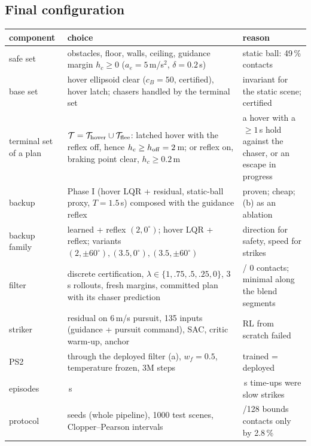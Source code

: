 \documentclass[11pt]{article}
\begin{document}
\subsection{Final configuration}
\begin{center}\small
\begin{tabularx}{\textwidth}{>{\raggedright\arraybackslash}p{2.6cm}>{\raggedright\arraybackslash}X>{\raggedright\arraybackslash}p{4.6cm}}\toprule
component & choice & reason\\\midrule
safe set & obstacles, floor, walls, ceiling, guidance margin $h_c\ge0$ ($a_e=5$\,m/s$^2$, $\delta=0.2$\,s) & static ball: 49\,\% contacts\\
base set & hover ellipsoid clear ($c_B=50$, certified), hover latch; chasers handled by the terminal set & invariant for the static scene; certified\\
terminal set of a plan & $\mathcal T=\mathcal T_{\rm hover}\cup\mathcal T_{\rm flee}$: latched hover with the reflex off, hence $h_c\ge h_{\rm off}=2$\,m; or reflex on, braking point clear, $h_c\ge0.2$\,m & a hover with a $\ge1$\,s hold against the chaser, or an escape in progress\\
backup & Phase I (hover LQR + residual, static-ball proxy, $T=1.5$\,s) composed with the guidance reflex & proven; cheap; (b) as an ablation\\
backup family & learned + reflex $(2,0^\circ)$; hover LQR + reflex; variants $(2,\pm60^\circ),(3.5,0^\circ),(3.5,\pm60^\circ)$ & direction for safety, speed for strikes\\
filter & discrete certification, $\lambda\in\{1,.75,.5,.25,0\}$, 3\,s rollouts, fresh margins, committed plan with its chaser prediction & 1.000 / 0 contacts; minimal along the blend segments\\
striker & residual on 6\,m/s pursuit, 135 inputs (guidance + pursuit command), SAC, critic warm-up, anchor & RL from scratch failed\\
PS2 & through the deployed filter (a), $w_f=0.5$, temperature frozen, 3M steps & trained = deployed\\
episodes & 15\,s & 10\,s time-ups were slow strikes\\
protocol & 3 seeds (whole pipeline), 1000 test scenes, Clopper--Pearson intervals & 0/128 bounds contacts only by 2.8\,\%\\\bottomrule
\end{tabularx}
\end{center}
\end{document}
